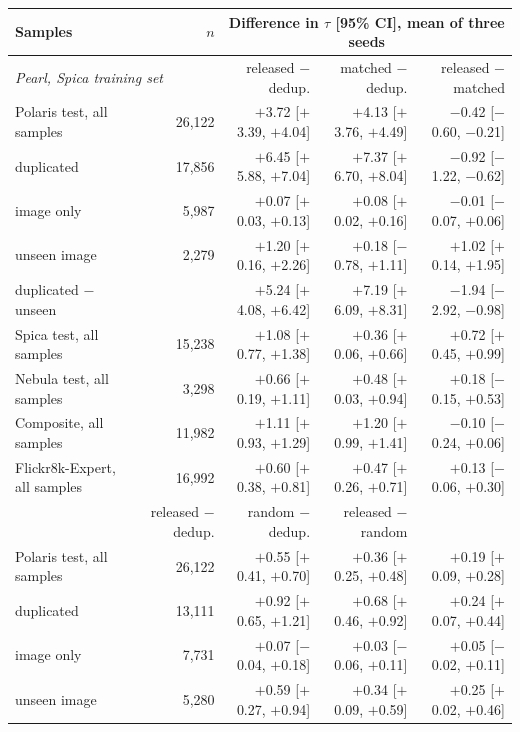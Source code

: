 \begin{tabular}{lrrrr}
\toprule
Samples & $n$ & \multicolumn{3}{c}{Difference in $\tau$ [95\% CI], mean of three seeds} \\
\midrule
\multicolumn{2}{l}{\emph{Pearl, Spica training set}} & released $-$ dedup. & matched $-$ dedup. & released $-$ matched \\
Polaris test, all samples & 26,122 & $+$3.72 [$+$3.39, $+$4.04] & $+$4.13 [$+$3.76, $+$4.49] & $-$0.42 [$-$0.60, $-$0.21] \\
\quad duplicated & 17,856 & $+$6.45 [$+$5.88, $+$7.04] & $+$7.37 [$+$6.70, $+$8.04] & $-$0.92 [$-$1.22, $-$0.62] \\
\quad image only & 5,987 & $+$0.07 [$+$0.03, $+$0.13] & $+$0.08 [$+$0.02, $+$0.16] & $-$0.01 [$-$0.07, $+$0.06] \\
\quad unseen image & 2,279 & $+$1.20 [$+$0.16, $+$2.26] & $+$0.18 [$-$0.78, $+$1.11] & $+$1.02 [$+$0.14, $+$1.95] \\
\quad duplicated $-$ unseen & & $+$5.24 [$+$4.08, $+$6.42] & $+$7.19 [$+$6.09, $+$8.31] & $-$1.94 [$-$2.92, $-$0.98] \\
Spica test, all samples & 15,238 & $+$1.08 [$+$0.77, $+$1.38] & $+$0.36 [$+$0.06, $+$0.66] & $+$0.72 [$+$0.45, $+$0.99] \\
Nebula test, all samples & 3,298 & $+$0.66 [$+$0.19, $+$1.11] & $+$0.48 [$+$0.03, $+$0.94] & $+$0.18 [$-$0.15, $+$0.53] \\
Composite, all samples & 11,982 & $+$1.11 [$+$0.93, $+$1.29] & $+$1.20 [$+$0.99, $+$1.41] & $-$0.10 [$-$0.24, $+$0.06] \\
Flickr8k-Expert, all samples & 16,992 & $+$0.60 [$+$0.38, $+$0.81] & $+$0.47 [$+$0.26, $+$0.71] & $+$0.13 [$-$0.06, $+$0.30] \\
\addlinespace
\multicolumn{2}{l}{\emph{DENEB, Nebula training set}} & released $-$ dedup. & random $-$ dedup. & released $-$ random \\
Polaris test, all samples & 26,122 & $+$0.55 [$+$0.41, $+$0.70] & $+$0.36 [$+$0.25, $+$0.48] & $+$0.19 [$+$0.09, $+$0.28] \\
\quad duplicated & 13,111 & $+$0.92 [$+$0.65, $+$1.21] & $+$0.68 [$+$0.46, $+$0.92] & $+$0.24 [$+$0.07, $+$0.44] \\
\quad image only & 7,731 & $+$0.07 [$-$0.04, $+$0.18] & $+$0.03 [$-$0.06, $+$0.11] & $+$0.05 [$-$0.02, $+$0.11] \\
\quad unseen image & 5,280 & $+$0.59 [$+$0.27, $+$0.94] & $+$0.34 [$+$0.09, $+$0.59] & $+$0.25 [$+$0.02, $+$0.46] \\

\end{tabular}
